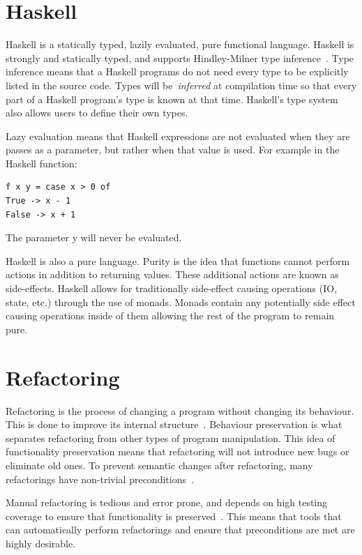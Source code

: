 \section{Haskell}
Haskell is a statically typed, lazily evaluated, pure functional language. Haskell is strongly and statically typed, and supports Hindley-Milner type inference~\citep{wikiIntro}. Type inference means that a Haskell programs do not need every type to be explicitly listed in the source code. Types will be~\textit{inferred} at compilation time so that every part of a Haskell program's type is known at that time. Haskell's type system also allows users to define their own types.

Lazy evaluation means that Haskell expressions are not evaluated when they are passes as a parameter, but rather when that value is used. For example in the Haskell function:
\clearpage
\begin{verbatim}
f x y = case x > 0 of
True -> x - 1
False -> x + 1
\end{verbatim}

The parameter y will never be evaluated.

Haskell is also a pure language. Purity is the idea that functions cannot perform actions in addition to returning values. These additional actions are known as side-effects. Haskell allows for traditionally side-effect causing operations (IO, state, etc.) through the use of monads. Monads contain any potentially side effect causing operations inside of them allowing the rest of the program to remain pure.

\section{Refactoring} 
Refactoring is the process of changing a program without changing its behaviour. This is done to improve its internal structure~\citep{fowler}. Behaviour preservation is what separates refactoring from other types of program manipulation. This idea of functionality preservation means that refactoring will not introduce new bugs or eliminate old ones. To prevent semantic changes after refactoring, many refactorings have non-trivial preconditions~\citep{refacTools}. 

Manual refactoring is tedious and error prone, and depends on high testing coverage to ensure that functionality is preserved~\citep{fowler}. This means that tools that can automatically perform refactorings and ensure that preconditions are met are highly desirable.

